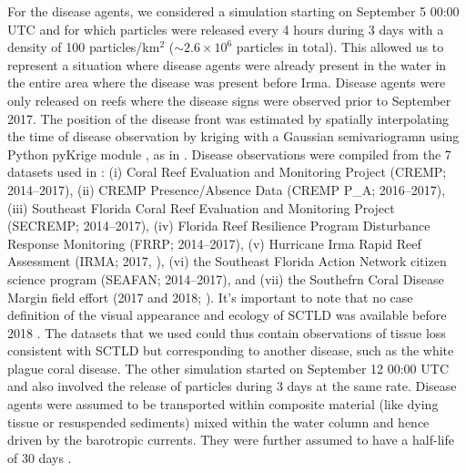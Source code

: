 \documentclass[fleqn,10pt]{wlscirep}
\begin{document}
For the disease agents, we considered a simulation starting on September 5 00:00 UTC and for which particles were released every 4 hours during 3 days with a density of 100 particles/km$^2$ ($\sim2.6\times 10^{6}$ particles in total). This allowed us to represent a situation where disease agents were already present in the water in the entire area where the disease was present before Irma. Disease agents were only released on reefs where the disease signs were observed prior to September 2017. The position of the disease front was estimated by spatially interpolating the time of disease observation by kriging with a Gaussian semivariogramn using Python pyKrige module \citep{murphy2014pykrige}, as in \cite{DobbySCTLD}. Disease observations were compiled from the 7 datasets used in \cite{muller2020spatial}: (i) Coral Reef Evaluation and Monitoring Project (CREMP; 2014–2017), (ii) CREMP Presence/Absence Data (CREMP P\_A; 2016–2017), (iii) Southeast Florida Coral Reef Evaluation and Monitoring Project (SECREMP; 2014–2017), (iv) Florida Reef Resilience Program Disturbance Response Monitoring (FRRP; 2014–2017), (v) Hurricane Irma Rapid Reef Assessment (IRMA; 2017, \cite{viehman2018}), (vi) the Southeast Florida Action Network citizen science program (SEAFAN; 2014–2017), and (vii) the Southefrn Coral Disease Margin field effort (2017 and 2018; \cite{neely2018surveying}). It's important to note that no case definition of the visual appearance and ecology of SCTLD was available before 2018 \citep{noaa2018}. The datasets that we used could thus contain observations of tissue loss consistent with SCTLD but corresponding to another disease, such as the white plague coral disease. The other simulation started on September 12 00:00 UTC and also involved the release of particles during 3 days at the same rate. Disease agents were assumed to be transported within composite material (like dying tissue or resuspended sediments) mixed within the water column and hence driven by the barotropic currents. They were further assumed to have a half-life of 30 days \citep{DobbySCTLD}.
\end{document}

